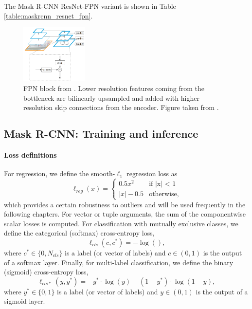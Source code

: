 The Mask R-CNN ResNet-FPN variant is shown in Table \ref{table:maskrcnn_resnet_fpn}.


\begin{figure}[t]
  \centering
  \includegraphics[width=0.3\textwidth]{figures/fpn}
\caption{
FPN block from \cite{FPN}.
Lower resolution features coming from the bottleneck are bilinearly upsampled
and added with higher resolution skip connections from the encoder.
Figure taken from \cite{FPN}.
}
\label{figure:fpn_block}
\end{figure}

\subsection{Mask R-CNN: Training and inference}
\paragraph{Loss definitions}
For regression, we define the smooth-$\ell_1$ regression loss as
\begin{equation}
\ell_{reg}(x) =
\begin{cases}
0.5x^2 &\text{if |x| < 1} \\
|x| - 0.5 &\text{otherwise,}
\end{cases}
\end{equation}
which provides a certain robustness to outliers and will be used
frequently in the following chapters. For vector or tuple arguments, the sum of the componentwise scalar
losses is computed.
For classification with mutually exclusive classes, we define the categorical (softmax) cross-entropy loss,
\begin{equation}
\ell_{cls}(c, c^*) = -\log(),
\end{equation}
where $c^* \in \{0,N_{cls}\}$ is a label (or vector of labels) and $c \in (0,1)$ is the output of a softmax layer. %
Finally, for multi-label classification, we define the binary (sigmoid) cross-entropy loss,
\begin{equation}
\ell_{cls*}(y, y^*) = -y^* \cdot \log(y) - (1 - y^*) \cdot \log(1 - y),
\end{equation}
where $y^* \in \{0,1\}$ is a label (or vector of labels) and $y \in (0,1)$ is the output of a sigmoid layer.

